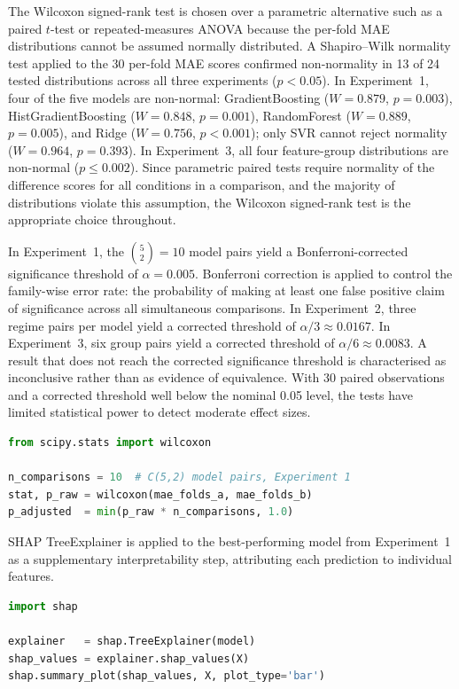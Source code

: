 \documentclass[11pt,a4paper]{report}
\begin{document}
The Wilcoxon signed-rank test is chosen over a parametric alternative such as a paired $t$-test or repeated-measures ANOVA because the per-fold MAE distributions cannot be assumed normally distributed. A Shapiro--Wilk normality test applied to the 30 per-fold MAE scores confirmed non-normality in 13 of 24 tested distributions across all three experiments ($p < 0.05$). In Experiment~1, four of the five models are non-normal: GradientBoosting ($W = 0.879$, $p = 0.003$), HistGradientBoosting ($W = 0.848$, $p = 0.001$), RandomForest ($W = 0.889$, $p = 0.005$), and Ridge ($W = 0.756$, $p < 0.001$); only SVR cannot reject normality ($W = 0.964$, $p = 0.393$). In Experiment~3, all four feature-group distributions are non-normal ($p \leq 0.002$). Since parametric paired tests require normality of the difference scores for all conditions in a comparison, and the majority of distributions violate this assumption, the Wilcoxon signed-rank test is the appropriate choice throughout.

In Experiment~1, the $\binom{5}{2} = 10$ model pairs yield a Bonferroni-corrected significance threshold of $\alpha = 0.005$. Bonferroni correction is applied to control the family-wise error rate: the probability of making at least one false positive claim of significance across all simultaneous comparisons. In Experiment~2, three regime pairs per model yield a corrected threshold of $\alpha/3 \approx 0.0167$. In Experiment~3, six group pairs yield a corrected threshold of $\alpha/6 \approx 0.0083$. A result that does not reach the corrected significance threshold is characterised as inconclusive rather than as evidence of equivalence. With 30 paired observations and a corrected
threshold well below the nominal 0.05 level, the tests have limited statistical power to detect
moderate effect sizes.

\begin{lstlisting}[language=Python, caption={Paired Wilcoxon signed-rank test with Bonferroni correction.}, label={lst:wilcoxon}]
from scipy.stats import wilcoxon

n_comparisons = 10  # C(5,2) model pairs, Experiment 1
stat, p_raw = wilcoxon(mae_folds_a, mae_folds_b)
p_adjusted  = min(p_raw * n_comparisons, 1.0)
\end{lstlisting}

SHAP TreeExplainer is applied to the best-performing model from Experiment~1 as a supplementary
interpretability step, attributing each prediction to individual features.

\begin{lstlisting}[language=Python, caption={SHAP TreeExplainer for per-prediction feature attribution.}, label={lst:shap}]
import shap

explainer   = shap.TreeExplainer(model)
shap_values = explainer.shap_values(X)
shap.summary_plot(shap_values, X, plot_type='bar')
\end{lstlisting}
\end{document}
